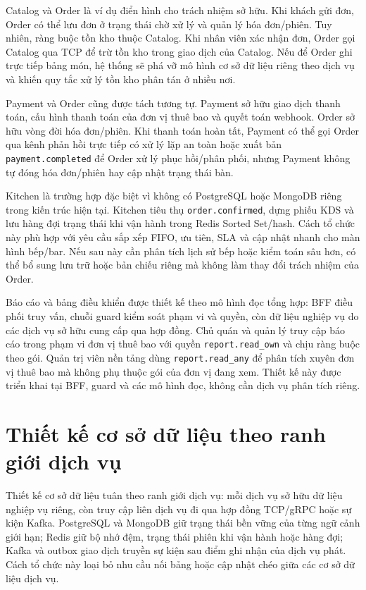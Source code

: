 Catalog và Order là ví dụ điển hình cho trách nhiệm sở hữu. Khi khách gửi đơn, Order có thể lưu đơn ở trạng thái chờ xử lý và quản lý hóa đơn/phiên. Tuy nhiên, ràng buộc tồn kho thuộc Catalog. Khi nhân viên xác nhận đơn, Order gọi Catalog qua TCP để trừ tồn kho trong giao dịch của Catalog. Nếu để Order ghi trực tiếp bảng món, hệ thống sẽ phá vỡ mô hình cơ sở dữ liệu riêng theo dịch vụ và khiến quy tắc xử lý tồn kho phân tán ở nhiều nơi.

Payment và Order cũng được tách tương tự. Payment sở hữu giao dịch thanh toán, cấu hình thanh toán của đơn vị thuê bao và quyết toán webhook. Order sở hữu vòng đời hóa đơn/phiên. Khi thanh toán hoàn tất, Payment có thể gọi Order qua kênh phản hồi trực tiếp có xử lý lặp an toàn hoặc xuất bản \texttt{payment.completed} để Order xử lý phục hồi/phân phối, nhưng Payment không tự đóng hóa đơn/phiên hay cập nhật trạng thái bàn.

Kitchen là trường hợp đặc biệt vì không có PostgreSQL hoặc MongoDB riêng trong kiến trúc hiện tại. Kitchen tiêu thụ \texttt{order.confirmed}, dựng phiếu KDS và lưu hàng đợi trạng thái khi vận hành trong Redis Sorted Set/hash. Cách tổ chức này phù hợp với yêu cầu sắp xếp FIFO, ưu tiên, SLA và cập nhật nhanh cho màn hình bếp/bar. Nếu sau này cần phân tích lịch sử bếp hoặc kiểm toán sâu hơn, có thể bổ sung lưu trữ hoặc bản chiếu riêng mà không làm thay đổi trách nhiệm của Order.

Báo cáo và bảng điều khiển được thiết kế theo mô hình đọc tổng hợp: BFF điều phối truy vấn, chuỗi guard kiểm soát phạm vi và quyền, còn dữ liệu nghiệp vụ do các dịch vụ sở hữu cung cấp qua hợp đồng. Chủ quán và quản lý truy cập báo cáo trong phạm vi đơn vị thuê bao với quyền \texttt{report.read\_own} và chịu ràng buộc theo gói. Quản trị viên nền tảng dùng \texttt{report.read\_any} để phân tích xuyên đơn vị thuê bao mà không phụ thuộc gói của đơn vị đang xem. Thiết kế này được triển khai tại BFF, guard và các mô hình đọc, không cần dịch vụ phân tích riêng.

\section{Thiết kế cơ sở dữ liệu theo ranh giới dịch vụ}

Thiết kế cơ sở dữ liệu tuân theo ranh giới dịch vụ: mỗi dịch vụ sở hữu dữ liệu nghiệp vụ riêng, còn truy cập liên dịch vụ đi qua hợp đồng TCP/gRPC hoặc sự kiện Kafka. PostgreSQL và MongoDB giữ trạng thái bền vững của từng ngữ cảnh giới hạn; Redis giữ bộ nhớ đệm, trạng thái phiên khi vận hành hoặc hàng đợi; Kafka và outbox giao dịch truyền sự kiện sau điểm ghi nhận của dịch vụ phát. Cách tổ chức này loại bỏ nhu cầu nối bảng hoặc cập nhật chéo giữa các cơ sở dữ liệu dịch vụ.

